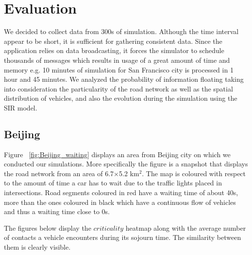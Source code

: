 \section{Evaluation}

We decided to collect data from 300s of simulation. Although the   
time interval appear to be short, it is sufficient for gathering consistent
data. Since the application relies on data broadcasting, it forces the simulator
to schedule thousands of messages which results in usage of a great amount of
time and memory e.g. 10 minutes of simulation for San Francisco city is
processed in 1 hour and 45 minutes.
We analyzed the probability of information floating taking into consideration
the particularity of the road network as well as the spatial distribution of
vehicles, and also the evolution during the simulation using the SIR model.

\subsection{Beijing}

Figure ~\ref{fig:Beijing_waiting} displays an area from Beijing city on which
we conducted our simulations. More specifically the figure is a snapshot that
displays the road network from an area of 6.7$\times$5.2 km$^2$. The map is
coloured with respect to the amount of time a car has to wait due to the traffic
lights placed in intersections. Road segments coloured in red have a waiting
time of about 40s, more than the ones coloured in black which have a continuous
flow of vehicles and thus a waiting time close to 0s.

The figures below display the $criticality$ heatmap along with the average
number of contacts a vehicle encounters during its sojourn time. The similarity
between them is clearly visible.

